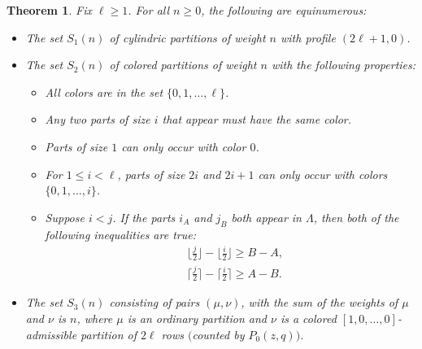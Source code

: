 \documentclass[pdftex]{sigma}
\numberwithin{equation}{section}
\newtheorem{Theorem}{Theorem}[section]
\theoremstyle{definition}
\begin{document}
\begin{Theorem} \label{thm:bij}
Fix $\ell\ge1$. For all $n\ge0$, the following are equinumerous:
\begin{itemize}\itemsep=0pt
\item The set $S_1(n)$ of cylindric partitions of weight $n$ with profile $(2\ell+1,0)$.
\item The set $S_2(n)$ of colored partitions of weight $n$ with the following properties:
\begin{itemize}\itemsep=0pt
\item All colors are in the set $\{0,1,\dots,\ell\}$.
\item Any two parts of size $i$ that appear must have the same color.
\item Parts of size $1$ can only occur with color $0$.
\item For $1\le i < \ell$, parts of size $2i$ and $2i+1$ can only occur with colors $\{0,1,\dots,i\}$.
\item Suppose $i<j$. If the parts $i_A$ and $j_{B}$ both appear in $\Lambda$, then both of the following inequalities are true:
\begin{align}
& \biggl\lfloor\frac j2\biggr\rfloor-\biggl\lfloor\frac i2\biggr\rfloor \ge B - A, \label{eq:floor} \\
& \biggl\lceil\frac j2\biggr\rceil-\biggl\lceil\frac i2\biggr\rceil \ge A - B. \label{eq:ceil}
\end{align}
\end{itemize}
\item The set $S_3(n)$ consisting of pairs $(\mu,\nu)$, with the sum of the weights of $\mu$ and $\nu$ is $n$, where $\mu$ is an ordinary partition and $\nu$ is a colored $[1,0,\dots,0]$-admissible partition of $2\ell$ rows $($counted by $P_0(z,q))$.
\end{itemize}
\end{Theorem}
\end{document}

